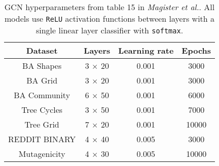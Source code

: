 \begin{table}
    \centering
    \begin{tabular}{c|ccc}
        \textbf{Dataset} &
        \textbf{Layers} &
        \textbf{Learning rate} &
        \textbf{Epochs} \\
        \midrule
        BA Shapes       & 3 $\times$ 20 & 0.001 & 3000 \\
        BA Grid         & 3 $\times$ 20 & 0.001 & 3000 \\
        BA Community    & 6 $\times$ 50 & 0.001 & 6000 \\
        Tree Cycles     & 3 $\times$ 50 & 0.001 & 7000 \\
        Tree Grid       & 7 $\times$ 20 & 0.001 & 10000 \\
        \midrule
        REDDIT BINARY   & 4 $\times$ 40 & 0.005 & 3000 \\
        Mutagenicity    & 4 $\times$ 30 & 0.005 & 10000 \\
    \end{tabular}
    \caption{GCN hyperparameters from table 15 in \textit{Magister et al.}\cite{magister2021gcexplainer}. All models use \texttt{ReLU} activation functions between layers with a single linear layer classifier with \texttt{softmax}.}
    \label{tab:GCN-params}
\end{table}

